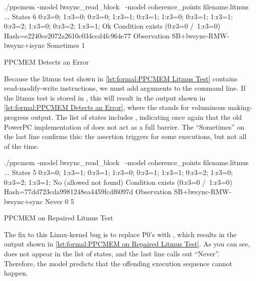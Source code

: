\begin{listing}[tbp]
\begin{VerbatimL}[numbers=none,xleftmargin=0pt]
./ppcmem -model lwsync_read_block \
         -model coherence_points filename.litmus
...
States 6
0:r3=0; 1:r3=0;
0:r3=0; 1:r3=1;
0:r3=1; 1:r3=0;
0:r3=1; 1:r3=1;
0:r3=2; 1:r3=0;
0:r3=2; 1:r3=1;
Ok
Condition exists (0:r3=0 /\ 1:r3=0)
Hash=e2240ce2072a2610c034ccd4fc964e77
Observation SB+lwsync-RMW-lwsync+isync Sometimes 1
\end{VerbatimL}
\caption{PPCMEM Detects an Error}
\label{lst:formal:PPCMEM Detects an Error}
\end{listing}

Because the litmus test shown in
\cref{lst:formal:PPCMEM Litmus Test}
contains read-modify-write instructions, we must add 
arguments to the command line.
If the litmus test is stored in ,
this will result in the output shown in
\cref{lst:formal:PPCMEM Detects an Error},
where the  stands for voluminous making-progress output.
The list of states includes \co{0:r3=0; 1:r3=0;}, indicating once again
that the old PowerPC implementation of \co{atomic_add_return()} does
not act as a full barrier.
The ``Sometimes'' on the last line confirms this: the assertion triggers
for some executions, but not all of the time.

\begin{listing}[tbp]
\begin{VerbatimL}[numbers=none,xleftmargin=0pt]
./ppcmem -model lwsync_read_block \
         -model coherence_points filename.litmus
...
States 5
0:r3=0; 1:r3=1;
0:r3=1; 1:r3=0;
0:r3=1; 1:r3=1;
0:r3=2; 1:r3=0;
0:r3=2; 1:r3=1;
No (allowed not found)
Condition exists (0:r3=0 /\ 1:r3=0)
Hash=77dd723cda9981248ea4459fcdf6097d
Observation SB+lwsync-RMW-lwsync+sync Never 0 5
\end{VerbatimL}
\caption{PPCMEM on Repaired Litmus Test}
\label{lst:formal:PPCMEM on Repaired Litmus Test}
\end{listing}

The fix to this Linux-kernel bug is to replace P0's  with
, which results in the output shown in
\cref{lst:formal:PPCMEM on Repaired Litmus Test}.
As you can see, \co{0:r3=0; 1:r3=0;} does not appear in the list of states,
and the last line calls out ``Never''.
Therefore, the model predicts that the offending execution sequence
cannot happen.

